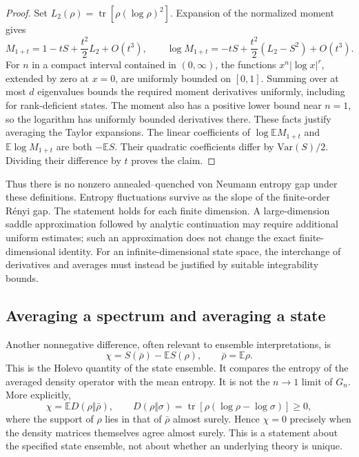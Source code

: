 \documentclass[11pt,letterpaper]{article}
\theoremstyle{plain}
\theoremstyle{definition}
\theoremstyle{remark}
\newcommand{\E}{\mathbb{E}}
\newcommand{\Var}{\text{Var}}
\DeclareMathOperator{\tr}{tr}
\begin{document}
\begin{proof}
Set $L_2(\rho)=\tr[\rho(\log\rho)^2]$.  Expansion of the normalized
moment gives
\begin{equation}
 M_{1+t}=1-tS+\frac{t^2}{2}L_2+O(t^3),\qquad
 \log M_{1+t}=-tS+\frac{t^2}{2}(L_2-S^2)+O(t^3).
 \label{eq06:moment_expansion}
\end{equation}
For $n$ in a compact interval contained in $(0,\infty)$, the functions
$x^n|\log x|^r$, extended by zero at $x=0$, are uniformly bounded on
$[0,1]$.  Summing over at most $d$ eigenvalues bounds the required
moment derivatives uniformly, including for rank-deficient states.
The moment also has a positive lower bound near $n=1$, so the logarithm
has uniformly bounded derivatives there.  These facts justify averaging
the Taylor expansions.  The linear coefficients of $\log\E M_{1+t}$
and $\E\log M_{1+t}$ are both $-\E S$.  Their quadratic coefficients
differ by $\Var(S)/2$.  Dividing their difference by $t$ proves the
claim.
\end{proof}

Thus there is no nonzero annealed--quenched von Neumann entropy gap
under these definitions.  Entropy fluctuations survive as the slope
of the finite-order R\'enyi gap.  The statement holds for each finite
dimension.  A large-dimension saddle approximation followed by analytic
continuation may require additional uniform estimates; such an
approximation does not change the exact finite-dimensional identity.
For an infinite-dimensional state space, the interchange of derivatives
and averages must instead be justified by suitable integrability bounds.

\subsection{Averaging a spectrum and averaging a state}
\label{subsec06:state_average}

Another nonnegative difference, often relevant to ensemble
interpretations, is
\begin{equation}
 \chi=S(\bar\rho)-\E S(\rho),\qquad \bar\rho=\E\rho.
 \label{eq06:holevo_quantity}
\end{equation}
This is the Holevo quantity of the state ensemble.  It compares the
entropy of the averaged density operator with the mean entropy.  It
is not the $n\to1$ limit of $G_n$.  More explicitly,
\begin{equation}
 \chi=\E D(\rho\Vert\bar\rho),\qquad
 D(\rho\Vert\sigma)=\tr[\rho(\log\rho-\log\sigma)]\geq0,
 \label{eq06:relative_entropy_identity}
\end{equation}
where the support of $\rho$ lies in that of $\bar\rho$ almost surely.
Hence $\chi=0$ precisely when the density matrices themselves agree
almost surely.  This is a statement about the specified state ensemble,
not about whether an underlying theory is unique.
\end{document}
